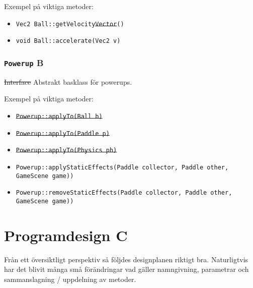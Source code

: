 \documentclass[a4paper,11pt]{article}
\begin{document}
\bigskip
\noindent Exempel på viktiga metoder:
\begin{itemize}
\item \texttt{Vec2 Ball::getVelocity\sout{Vector}()}
\item \texttt{void Ball::accelerate(Vec2 v)}
\end{itemize}

\subsubsection{\texttt{Powerup} B}
\noindent \sout{Interface} Abstrakt basklass för powerups.

\bigskip
\noindent Exempel på viktiga metoder:
\begin{itemize}
\item \sout{\texttt{Powerup::applyTo(Ball b)}}
\item \sout{\texttt{Powerup::applyTo(Paddle p)}}
\item \sout{\texttt{Powerup::applyTo(Physics ph)}}
\item \texttt{Powerup::applyStaticEffects(Paddle collector, Paddle other, GameScene game))}
\item \texttt{Powerup::removeStaticEffects(Paddle collector, Paddle other, GameScene game))}
\end{itemize}

\section{Programdesign C}
Från ett översiktligt perspektiv så följdes designplanen riktigt bra. Naturligtvis har det blivit
många små förändringar vad gäller namngivning, parametrar och sammanslagning / uppdelning av
metoder.
\end{document}
